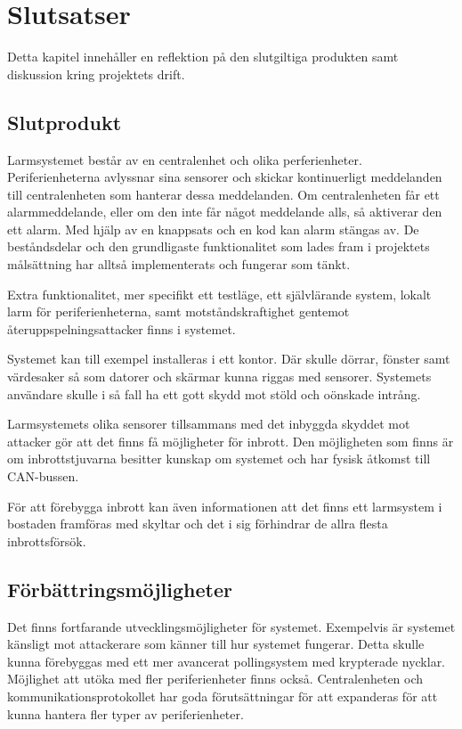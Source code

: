\documentclass[a4paper]{article}
\begin{document}

\section{Slutsatser}
Detta kapitel innehåller en reflektion på den slutgiltiga produkten samt diskussion kring projektets drift.
\subsection{Slutprodukt}

Larmsystemet består av en centralenhet och olika perferienheter.
Periferienheterna avlyssnar sina sensorer och skickar kontinuerligt meddelanden till centralenheten som hanterar dessa meddelanden.
Om centralenheten får ett alarmmeddelande, eller om den inte får något meddelande alls, så aktiverar den ett alarm.
Med hjälp av en knappsats och en kod kan alarm stängas av.
De beståndsdelar och den grundligaste funktionalitet som lades fram i projektets målsättning har alltså implementerats och fungerar som tänkt.

Extra funktionalitet, mer specifikt ett testläge, ett självlärande system, lokalt larm för periferienheterna, samt motståndskraftighet gentemot återuppspelningsattacker finns i systemet.

Systemet kan till exempel installeras i ett kontor.
Där skulle dörrar, fönster samt värdesaker så som datorer och skärmar kunna riggas med sensorer.
Systemets användare skulle i så fall ha ett gott skydd mot stöld och oönskade intrång.

Larmsystemets olika sensorer tillsammans med det inbyggda skyddet mot attacker gör att det finns få möjligheter för inbrott.
Den möjligheten som finns är om inbrottstjuvarna besitter kunskap om systemet och har fysisk åtkomst till CAN-bussen.

För att förebygga inbrott kan även informationen att det finns ett larmsystem i bostaden framföras med skyltar och det i sig förhindrar de allra flesta inbrottsförsök.

\subsection{Förbättringsmöjligheter}
Det finns fortfarande utvecklingsmöjligheter för systemet.
Exempelvis är systemet känsligt mot attackerare som känner till hur systemet fungerar.
Detta skulle kunna förebyggas med ett mer avancerat pollingsystem med krypterade nycklar.
Möjlighet att utöka med fler periferienheter finns också.
Centralenheten och kommunikationsprotokollet har goda förutsättningar för att expanderas för att kunna hantera fler typer av periferienheter.
\end{document}
